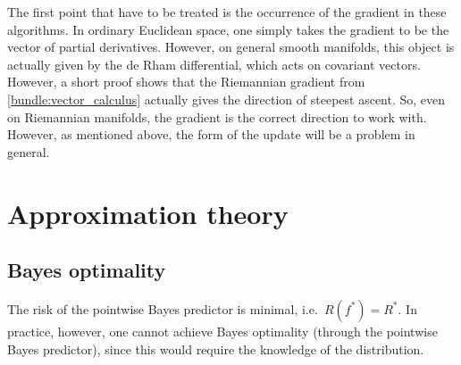     The first point that have to be treated is the occurrence of the gradient in these algorithms. In ordinary Euclidean space, one simply takes the gradient to be the vector of partial derivatives. However, on general smooth manifolds, this object is actually given by the de Rham differential, which acts on covariant vectors. However, a short proof shows that the Riemannian gradient from \cref{bundle:vector_calculus} actually gives the direction of steepest ascent. So, even on Riemannian manifolds, the gradient is the correct direction to work with. However, as mentioned above, the form of the update will be a problem in general.


\section{Approximation theory}
\subsection{Bayes optimality}


    \begin{property}
        The risk of the pointwise Bayes predictor is minimal, i.e.~$R(f^*)=R^*$. In practice, however, one cannot achieve Bayes optimality (through the pointwise Bayes predictor), since this would require the knowledge of the distribution.
    \end{property}

